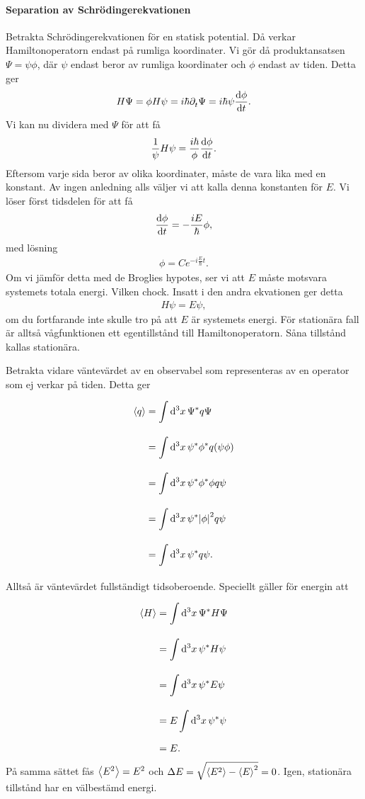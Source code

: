 \paragraph{Separation av Schrödingerekvationen}
Betrakta Schrödingerekvationen för en statisk potential. Då verkar Hamiltonoperatorn endast på rumliga koordinater. Vi gör då produktansatsen $\Psi = \psi\phi$, där $\psi$ endast beror av rumliga koordinater och $\phi$ endast av tiden. Detta ger
\begin{align*}
	H\Psi = \phi H\psi = i\hbar\partial_{t}^{}\Psi = i\hbar \psi\dv{\phi}{t}.
\end{align*}
Vi kan nu dividera med $\Psi$ för att få
\begin{align*}
	\frac{1}{\psi}H\psi = \frac{i\hbar}{\phi}\dv{\phi}{t}.
\end{align*}
Eftersom varje sida beror av olika koordinater, måste de vara lika med en konstant. Av ingen anledning alls väljer vi att kalla denna konstanten för $E$. Vi löser först tidsdelen för att få
\begin{align*}
	\dv{\phi}{t} = -\frac{iE}{\hbar}\phi,
\end{align*}
med lösning
\begin{align*}
	\phi = Ce^{-i\frac{E}{\hbar}t}.
\end{align*}
Om vi jämför detta med de Broglies hypotes, ser vi att $E$ måste motsvara systemets totala energi. Vilken chock. Insatt i den andra ekvationen ger detta
\begin{align*}
	H\psi = E\psi,
\end{align*}
om du fortfarande inte skulle tro på att $E$ är systemets energi. För stationära fall är alltså vågfunktionen ett egentillstånd till Hamiltonoperatorn. Såna tillstånd kallas stationära.

Betrakta vidare väntevärdet av en observabel som representeras av en operator som ej verkar på tiden. Detta ger
\begin{align*}
	\expval{q} &= \int\limits_{}^{}\dd[3]{x}\Psi^{*}q\Psi \\
	           &= \int\limits_{}^{}\dd[3]{x}\psi^{*}\phi^{*}q(\psi\phi) \\
	           &= \int\limits_{}^{}\dd[3]{x}\psi^{*}\phi^{*}\phi q\psi \\
	           &= \int\limits_{}^{}\dd[3]{x}\psi^{*}\abs{\phi}^{2} q\psi \\
	           &= \int\limits_{}^{}\dd[3]{x}\psi^{*} q\psi.
\end{align*}
Alltså är väntevärdet fullständigt tidsoberoende. Speciellt gäller för energin att
\begin{align*}
	\expval{H} &= \int\limits_{}^{}\dd[3]{x}\Psi^{*} H\Psi \\
	           &= \int\limits_{}^{}\dd[3]{x}\psi^{*} H\psi \\
	           &= \int\limits_{}^{}\dd[3]{x}\psi^{*} E\psi \\
	           &= E\int\limits_{}^{}\dd[3]{x}\psi^{*}\psi \\
	           &= E.
\end{align*}
På samma sättet fås $\expval{E^{2}} = E^{2}$ och $\Delta E = \sqrt{\expval{E^{2}} - \expval{E}^{2}} = 0$. Igen, stationära tillstånd har en välbestämd energi.

